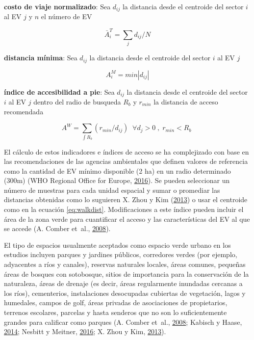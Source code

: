 \documentclass[12pt,a4paper,openany]{book}
\theoremstyle{definition}
\theoremstyle{definition}
\theoremstyle{definition}
\theoremstyle{remark}
\begin{document}
\textbf{costo de viaje normalizado}: Sea \(d_{ij}\) la distancia desde
el centroide del sector \(i\) al EV \(j\) y \(n\) el número de EV

\begin{equation}
\bar{A}^{T}_i =\sum_j{d_{ij}/N}
\label{eq:ncosto}
\end{equation}

\textbf{distancia mínima}: Sea \(d_{ij}\) la distancia desde el
centroide del sector \(i\) al EV \(j\)

\begin{equation}
A^{M}_i=min\left | d_{ij} \right | 
\label{eq:mindist}
\end{equation}

\textbf{índice de accesibilidad a pie}: Sea \(d_{ij}\) la distancia
desde el centroide del sector \(i\) al EV \(j\) dentro del radio de
busqueda \(R_b\) y \(r_{min}\) la distancia de acceso recomendada

\begin{equation}
A^{W}= \sum_{\int R_b }{(r_{min}/d_{ij})}  \;  \; \forall  d_j>0 \; , \; r_{min}<R_b  \;
\label{eq:walkdist}
\end{equation}

El cálculo de estos indicadores e índices de acceso se ha complejizado
con base en las recomendaciones de las agencias ambientales que definen
valores de referencia como la cantidad de EV mínimo disponible (2 ha) en
un radio determinado (300m) (WHO Regional Office for Europe,
\protect\hyperlink{ref-who2016urban}{2016}). Se pueden seleccionar un
número de muestras para cada unidad espacial y sumar o promediar las
distancias obtenidas como lo suguieren X. Zhou y Kim
(\protect\hyperlink{ref-zhou_social_2013}{2013}) o usar el centroide
como en la ecuación \eqref{eq:walkdist}. Modificaciones a este índice
pueden incluir el área de la zona verde para cuantificar el acceso y las
características del EV al que se accede (A. Comber et~al.,
\protect\hyperlink{ref-comber_using_2008}{2008}).

El tipo de espacios usualmente aceptados como espacio verde urbano en
los estudios incluyen parques y jardines públicos, corredores verdes
(por ejemplo, adyacentes a ríos y canales), reservas naturales locales,
áreas comunes, pequeñas áreas de bosques con sotobosque, sitios de
importancia para la conservación de la naturaleza, áreas de drenaje (es
decir, áreas regularmente inundadas cercanas a los ríos), cementerios,
instalaciones desocupadas cubiertas de vegetación, lagos y humedales,
campos de golf, áreas privadas de asociaciones de propietarios, terrenos
escolares, parcelas y hasta senderos que no son lo suficientemente
grandes para calificar como parques (A. Comber et~al.,
\protect\hyperlink{ref-comber_using_2008}{2008}; Kabisch y Haase,
\protect\hyperlink{ref-kabisch_green_2014}{2014}; Nesbitt y Meitner,
\protect\hyperlink{ref-nesbitt_exploring_2016}{2016}; X. Zhou y Kim,
\protect\hyperlink{ref-zhou_social_2013}{2013}).
\end{document}
